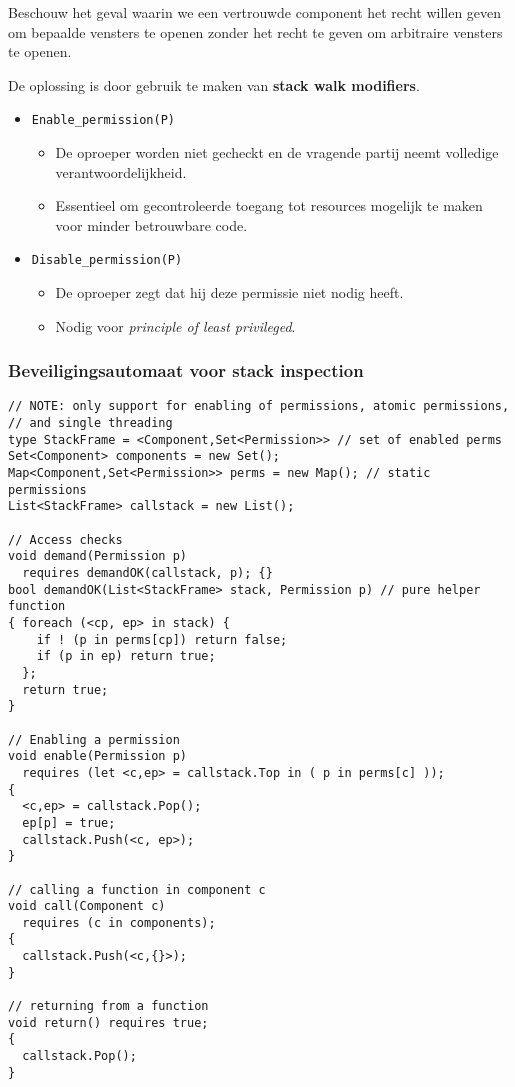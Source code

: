 \documentclass[../main.tex]{subfiles}
\begin{document}
\begin{blockquote}
Beschouw het geval waarin we een vertrouwde component het recht willen geven om bepaalde vensters te openen zonder het recht te geven om arbitraire vensters te openen.
\end{blockquote}
\noindent
De oplossing is door gebruik te maken van \textbf{stack walk modifiers}.
\begin{itemize}
	\item \texttt{Enable\_permission(P)}
	\begin{itemize}
		\item De oproeper worden niet gecheckt en de vragende partij neemt volledige verantwoordelijkheid.
		\item Essentieel om gecontroleerde toegang tot resources mogelijk te maken voor minder betrouwbare code.
	\end{itemize}
	\item \texttt{Disable\_permission(P)}
	\begin{itemize}
		\item De oproeper zegt dat hij deze permissie niet nodig heeft.
		\item Nodig voor \textit{principle of least privileged}.
	\end{itemize}
\end{itemize}

\subsubsection{Beveiligingsautomaat voor stack inspection}
\begin{lstlisting}
// NOTE: only support for enabling of permissions, atomic permissions,
// and single threading
type StackFrame = <Component,Set<Permission>> // set of enabled perms
Set<Component> components = new Set();
Map<Component,Set<Permission>> perms = new Map(); // static permissions
List<StackFrame> callstack = new List();

// Access checks
void demand(Permission p)
  requires demandOK(callstack, p); {}
bool demandOK(List<StackFrame> stack, Permission p) // pure helper function
{ foreach (<cp, ep> in stack) {
    if ! (p in perms[cp]) return false;
    if (p in ep) return true;
  };
  return true;
}

// Enabling a permission
void enable(Permission p)
  requires (let <c,ep> = callstack.Top in ( p in perms[c] ));
{
  <c,ep> = callstack.Pop();
  ep[p] = true;
  callstack.Push(<c, ep>);
}

// calling a function in component c
void call(Component c)
  requires (c in components);
{
  callstack.Push(<c,{}>);
}

// returning from a function
void return() requires true;
{
  callstack.Pop();
}
\end{lstlisting}
\end{document}
